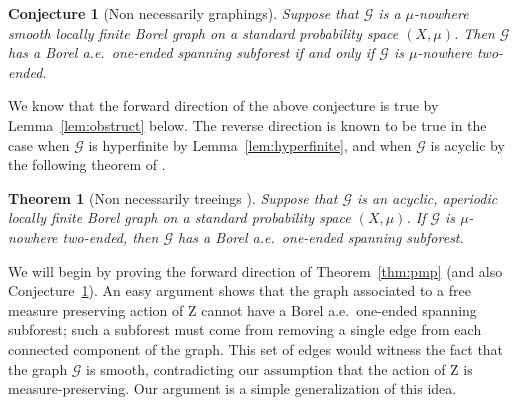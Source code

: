 \documentclass[11pt]{amsart}
\theoremstyle{definition}
\theoremstyle{plain}
\newtheorem{thm}[definition]{Theorem}
\newtheorem{conj}[definition]{Conjecture}
\newcommand{\<}{\langle}
\renewcommand{\>}{\rangle}
\newcommand{\Z}{\bm{\mathrm{Z}}}
\newcommand{\Ggraph}{\mathcal{G}}
\newcommand{\pmp}{\text{p.m.p.}}
\begin{document}
\begin{conj}[Non necessarily \pmp{} graphings] \label{conj:pmp}
Suppose that $\Ggraph$ is a $\mu$-nowhere smooth locally finite Borel
graph on a standard probability space $(X,\mu)$. Then $\Ggraph$ has a Borel a.e.\
one-ended spanning subforest if and only if $\Ggraph$ is $\mu$-nowhere two-ended.
\end{conj}

We know that the forward direction of the above conjecture is true by
Lemma~\ref{lem:obstruct} below. The reverse direction is known to be true
in the case when $\Ggraph$ is hyperfinite by Lemma~\ref{lem:hyperfinite}, and when
$\Ggraph$ is acyclic by the following theorem of \cite{CMT-D}.
\begin{thm}[Non necessarily \pmp{} treeings {\cite[Theorem 1.5]{CMT-D}}]\label{thm:acyclic}
  Suppose that $\Ggraph$ is an acyclic, aperiodic locally finite Borel graph on a standard
  probability space $(X,\mu)$. If ${\Ggraph}$ is $\mu$-nowhere two-ended, then
  $\Ggraph$ has a Borel a.e.\  one-ended spanning subforest.
\end{thm}

We will begin by proving the forward direction of
Theorem~\ref{thm:pmp} (and also Conjecture~\ref{conj:pmp}). An easy
argument shows that the graph associated to a
free measure preserving action of $\Z$ cannot have a Borel a.e.\ one-ended spanning
subforest; such a subforest must come from removing a single
edge from each connected component of the graph. This set of edges would witness the
fact that the graph $\Ggraph$ is smooth, contradicting our assumption that the
action of $\Z$ is measure-preserving. Our argument is a simple
generalization of this idea.
\end{document}
